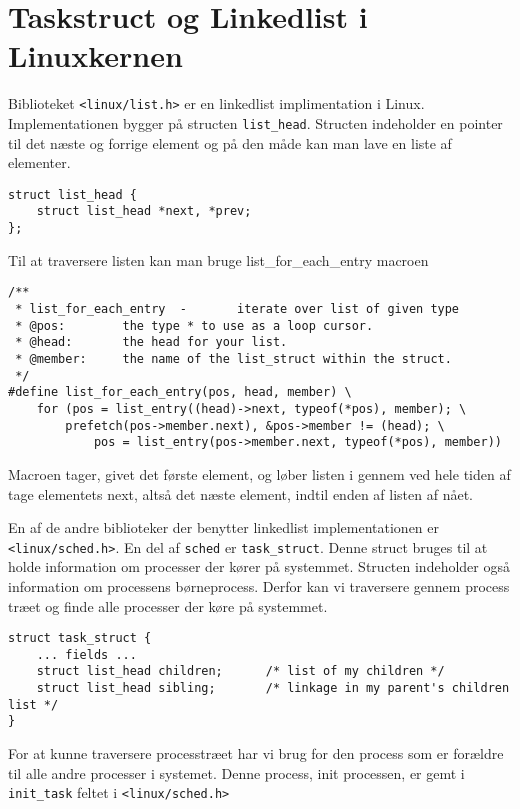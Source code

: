 \documentclass[danish]{report}
\begin{document}
\section{Taskstruct og Linkedlist i Linuxkernen}

Biblioteket \texttt{<linux/list.h>} er en linkedlist implimentation i Linux. Implementationen bygger på structen \texttt{list\_head}. Structen indeholder en pointer til det næste og forrige element og på den måde kan man lave en liste af elementer.

\begin{lstlisting}
struct list_head {
    struct list_head *next, *prev;
};
\end{lstlisting}

Til at traversere listen kan man bruge list\_for\_each\_entry macroen

\begin{lstlisting}
/**
 * list_for_each_entry  -       iterate over list of given type
 * @pos:        the type * to use as a loop cursor.
 * @head:       the head for your list.
 * @member:     the name of the list_struct within the struct.
 */
#define list_for_each_entry(pos, head, member) \
    for (pos = list_entry((head)->next, typeof(*pos), member); \
        prefetch(pos->member.next), &pos->member != (head); \
            pos = list_entry(pos->member.next, typeof(*pos), member))
\end{lstlisting}

Macroen tager, givet det første element, og løber listen i gennem ved hele tiden af tage elementets next, altså det næste element, indtil enden af listen af nået.

En af de andre biblioteker der benytter linkedlist implementationen er \texttt{<linux/sched.h>}. En del af \texttt{sched} er \texttt{task\_struct}. Denne struct bruges til at holde information om processer der kører på systemmet. Structen indeholder også information om processens børneprocess. Derfor kan vi traversere gennem process træet og finde alle processer der køre på systemmet.

\begin{lstlisting}
struct task_struct {
    ... fields ...
    struct list_head children;      /* list of my children */
    struct list_head sibling;       /* linkage in my parent's children list */
}
\end{lstlisting}

For at kunne traversere processtræet har vi brug for den process som er forældre til alle andre processer i systemet. Denne process, init processen, er gemt i \texttt{init\_task} feltet i \texttt{<linux/sched.h>}
\end{document}
